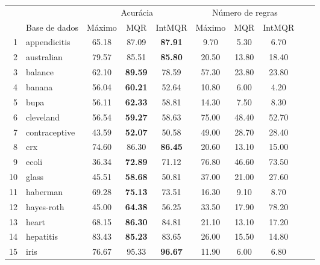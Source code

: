 
\begin{table}[H]
\begin{centering}
\begin{tabular}{rlcccccccc}
 \toprule
 \multicolumn{1}{c}{} & \multicolumn{1}{c}{} & \multicolumn{3}{c}{Acurácia} & \multicolumn{3}{c}{Número de regras}\tabularnewline
 \cmidrule(lr){3-5} \cmidrule(lr){6-8}
& Base de dados & Máximo & MQR & IntMQR & Máximo & MQR & IntMQR\\ 
 \hline
  1 & appendicitis & 65.18 & 87.09 & \textbf{87.91} & 9.70 & \cellcolor[gray]{0.85}5.30 & 6.70 \\
  2 & australian & 79.57 & 85.51 & \textbf{85.80} & 20.50 & \cellcolor[gray]{0.85}13.80 & 18.40 \\
  3 & balance & 62.10 & \textbf{89.59} & 78.59 & 57.30 & \cellcolor[gray]{0.85}23.80 & \cellcolor[gray]{0.85}23.80 \\
  4 & banana & 56.04 & \textbf{60.21} & 52.64 & 10.80 & 6.00 & \cellcolor[gray]{0.85}4.20 \\
  5 & bupa & 56.11 & \textbf{62.33} & 58.81 & 14.30 & \cellcolor[gray]{0.85}7.50 & 8.30 \\
  6 & cleveland & 56.54 & \textbf{59.27} & 58.63 & 75.00 & \cellcolor[gray]{0.85}48.40 & 52.70 \\
  7 & contraceptive & 43.59 & \textbf{52.07} & 50.58 & 49.00 & 28.70 & \cellcolor[gray]{0.85}28.40 \\
  8 & crx & 74.60 & 86.30 & \textbf{86.45} & 20.60 & \cellcolor[gray]{0.85}13.10 & 15.00 \\
  9 & ecoli & 36.34 & \textbf{72.89} & 71.12 & 76.80 & \cellcolor[gray]{0.85}46.60 & 73.50 \\
  10 & glass & 45.51 & \textbf{58.68} & 50.81 & 37.00 & \cellcolor[gray]{0.85}21.00 & 27.60 \\
  11 & haberman & 69.28 & \textbf{75.13} & 73.51 & 16.30 & 9.10 & \cellcolor[gray]{0.85}8.70 \\
  12 & hayes-roth & 45.00 & \textbf{64.38} & 56.25 & 33.50 & \cellcolor[gray]{0.85}17.90 & 78.20 \\
  13 & heart & 68.15 & \textbf{86.30} & 84.81 & 21.10 & \cellcolor[gray]{0.85}13.10 & 17.20 \\
  14 & hepatitis & 83.43 & \textbf{85.23} & 83.65 & 26.00 & 15.50 & \cellcolor[gray]{0.85}14.80 \\
  15 & iris & 76.67 & 95.33 & \textbf{96.67} & 11.90 & \cellcolor[gray]{0.85}6.00 & 6.80 \\

\end{tabular}
\end{centering}
\end{table}
